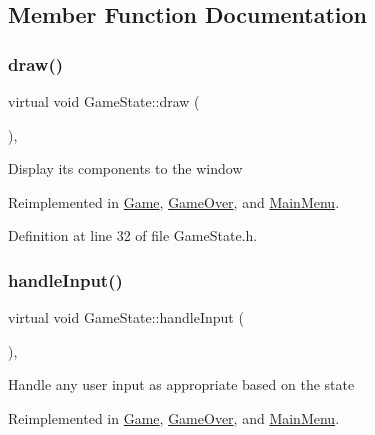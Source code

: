 \subsection{Member Function Documentation}
\mbox{\label{class_game_state_adf753ecc90e0b309c849b117036e619e}} 
\subsubsection{\texorpdfstring{draw()}{draw()}}
{\footnotesize\ttfamily virtual void Game\+State\+::draw (\begin{DoxyParamCaption}{ }\end{DoxyParamCaption})\hspace{0.3cm}{\ttfamily [inline]}, {\ttfamily [virtual]}}

Display its components to the window 

Reimplemented in \mbox{\hyperlink{class_game_a9dbbb6429980a91196ed07d299404304}{Game}}, \mbox{\hyperlink{class_game_over_a29ee6ef26eca92bac58c9917e933bce4}{Game\+Over}}, and \mbox{\hyperlink{class_main_menu_a54ec1eed16b49cac99d640feab93e119}{Main\+Menu}}.



Definition at line 32 of file Game\+State.\+h.

\mbox{\label{class_game_state_a734dd3521eb3056ee7d3f3e7c982b5a9}} 
\subsubsection{\texorpdfstring{handleInput()}{handleInput()}}
{\footnotesize\ttfamily virtual void Game\+State\+::handle\+Input (\begin{DoxyParamCaption}{ }\end{DoxyParamCaption})\hspace{0.3cm}{\ttfamily [inline]}, {\ttfamily [virtual]}}

Handle any user input as appropriate based on the state 

Reimplemented in \mbox{\hyperlink{class_game_a59b929e54a2879beab72fc6ce724c313}{Game}}, \mbox{\hyperlink{class_game_over_ad503a45f38d4472d3a91c096390c4aea}{Game\+Over}}, and \mbox{\hyperlink{class_main_menu_aa73613e97c322cba65028f3693b8c665}{Main\+Menu}}.




